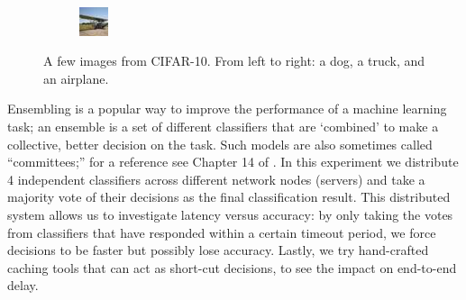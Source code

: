 \documentclass[12pt]{article}
\begin{document}
\begin{figure}
\begin{subfigure}[b]{0.2\textwidth}
    \end{subfigure}
    ~
    \begin{subfigure}[b]{0.2\textwidth}
        \includegraphics[width=\textwidth]{image5.jpeg}
    \end{subfigure}
    \caption{A few images from CIFAR-10. From left to right: a dog, a truck, and an airplane.}
    \label{fig:cifar10_images}
\end{figure}

Ensembling is a popular way to improve the performance of a machine learning task; an ensemble is a set of different classifiers that are ‘combined’ to make a collective, better decision on the task. 
Such models are also sometimes called ``committees;'' for a reference see Chapter 14 of \cite{bishop}.
In this experiment we distribute 4 independent classifiers across different network nodes (servers) and take a majority vote of their decisions as the final classification result.
This distributed system allows us to investigate latency versus accuracy: by only taking the votes from classifiers that have responded within a certain timeout period, we force decisions to be faster but possibly lose accuracy.
Lastly, we try hand-crafted caching tools that can act as short-cut decisions, to see the impact on end-to-end delay.
\end{document}
